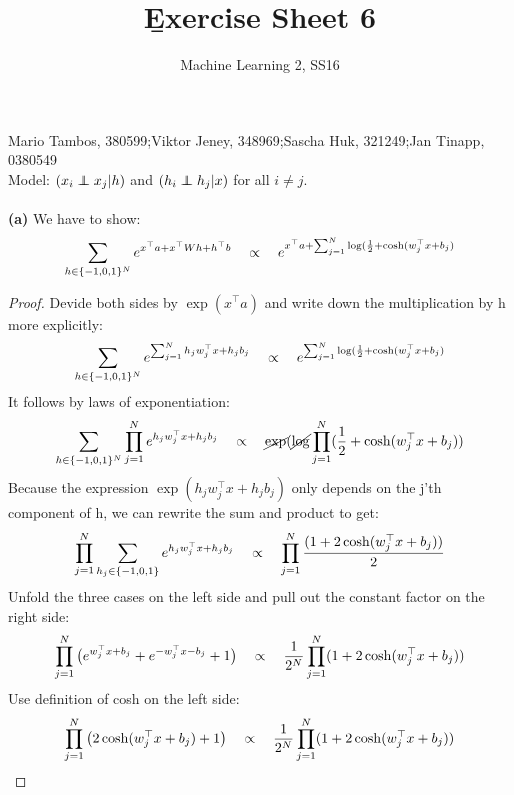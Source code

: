 \documentclass[a4paper]{article}
\newcommand\indep{\protect\mathpalette{\protect\indeP}{\perp}}
\def\indeP#1#2{\mathrel{\rlap{$#1#2$}\mkern2mu{#1#2}}}
\newcommand{\hto}{{h^\top}}
\newcommand{\xt}{{x^\top}}
\newcommand{\1}{\mathds{1}}
\begin{document}
\title{\b{Exercise Sheet 6}}
\author{Machine Learning 2, SS16}

\maketitle

Mario Tambos, 380599;\quad Viktor Jeney, 348969;\quad Sascha Huk, 321249;\quad Jan Tinapp, 0380549\\


Model: $(x_i \indep x_j | h)$ 
and $(h_i \indep h_j | x)$ for all $i\neq j$.  
\\
\\
\textbf{(a)} We have to show:
\begin{gather*}
	\sum_{h\in\{-1,0,1\}^N} e^{\xt a + \xt Wh + \hto b }
	\quad \propto \quad
	e^{\xt a + \sum_{j=1}^N \log({1\over 2} + \cosh(w^\top_j x + b_j)}  
\end{gather*}
\begin{proof}
Devide both sides by $\exp(x^\top a)$ and write down the multiplication by h more explicitly:
\begin{gather*}
	\sum_{h\in\{-1,0,1\}^N} e^{\sum_{j=1}^N h_j w_j^\top x + h_j b_j }
	\quad \propto \quad
	e^{\sum_{j=1}^N \log({1\over 2} + \cosh(w^\top_j x + b_j)}  
\end{gather*}
It follows by laws of exponentiation: 
\begin{gather*}
	\sum_{h\in\{-1,0,1\}^N} \prod_{j=1}^N e^{ h_j w_j^\top x + h_j b_j }
	\quad \propto \quad
	\cancel{\exp}(\cancel{\log}\prod_{j=1}^N ({1\over 2} + \cosh(w^\top_j x + b_j))  
\end{gather*} 
Because the expression $\exp( h_j w_j^\top x + h_j b_j )$ only depends on the j'th component of h, 
we can rewrite the sum and product to get:
\begin{gather*}
	\prod_{j=1}^N \sum_{h_j\in\{-1,0,1\}} e^{ h_j w_j^\top x + h_j b_j }
	\quad \propto \quad
	\prod_{j=1}^N {(1 + 2\cosh(w^\top_j x + b_j) ) \over 2} 
\end{gather*}
Unfold the three cases on the left side and pull out the constant factor on the right side:
\begin{gather*}
	\prod_{j=1}^N \big( e^{w_j^\top x + b_j}  +  e^{-w_j^\top x - b_j}   +  1  \big)
	\quad \propto \quad
	{1 \over 2^N}\prod_{j=1}^N (1 + 2\cosh(w^\top_j x + b_j)  )
\end{gather*}
Use definition of cosh on the left side:
\begin{gather*}
	\prod_{j=1}^N \big( 2\cosh(w^\top_j x + b_j)   +  1  \big)
	\quad \propto \quad
	{1 \over 2^N}\prod_{j=1}^N (1 + 2\cosh(w^\top_j x + b_j)  )
\end{gather*}
\end{proof}
\end{document}
